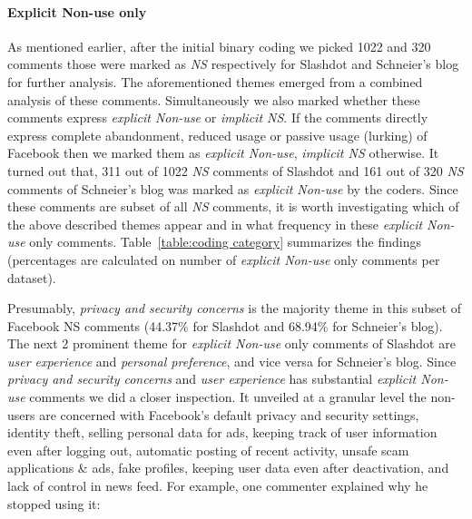 \paragraph{Explicit Non-use only}
As mentioned earlier, after the initial binary coding we picked 1022 and 320 comments those were marked as \emph{NS} respectively for Slashdot and Schneier's blog for further analysis. The aforementioned themes emerged from a combined analysis of these comments. Simultaneously we also marked whether these comments express \emph{explicit Non-use} or \emph{implicit NS}. If the comments directly express complete abandonment, reduced usage or passive usage (lurking) of Facebook then we marked them as \emph{explicit Non-use}, \emph{implicit NS} otherwise. It turned out that, 311 out of 1022 \emph{NS} comments of Slashdot and 161 out of 320 \emph{NS} comments of Schneier's blog was marked as \emph{explicit Non-use} by the coders. Since these comments are subset of all \emph{NS} comments, it is worth investigating which of the above described themes appear and in what frequency in these \emph{explicit Non-use} only comments. Table~\ref{table:coding category} summarizes the findings (percentages are calculated on number of \emph{explicit Non-use} only comments per dataset). 


Presumably, \textit{privacy and security concerns} is the majority theme in this subset of Facebook {NS} comments (44.37\% for Slashdot and 68.94\% for Schneier's blog). The next 2 prominent theme for \emph{explicit Non-use} only comments of Slashdot are \textit{user experience} and \textit{personal preference}, and vice versa for Schneier's blog. Since \textit{privacy and security concerns} and \textit{user experience} has substantial \emph{explicit Non-use} comments we did a closer inspection. It unveiled at a granular level the non-users are concerned with Facebook's default privacy and security settings, identity theft, selling personal data for ads, keeping track of user information even after logging out, automatic posting of recent activity, unsafe scam applications \& ads, fake profiles, keeping user data even after deactivation, and lack of control in news feed. For example, one commenter explained why he stopped using it: 

